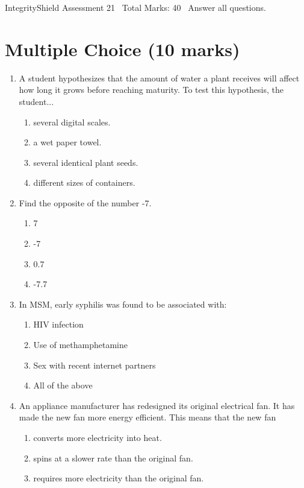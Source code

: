 \documentclass[12pt]{article}
\begin{document}
\begin{center}
IntegrityShield Assessment 21 \
Total Marks: 40 \
Answer all questions.
\end{center}

\section*{Multiple Choice (10 marks)}
\begin{enumerate}[label=\arabic*.]
\item A student hypothesizes that the amount of water a plant receives will affect how long it grows before reaching maturity. To test this hypothesis, the student...
\begin{enumerate}[label=(\alph*)]
    \item several digital scales.
    \item a wet paper towel.
    \item several identical plant seeds.
    \item different sizes of containers.
\end{enumerate}
\item Find the opposite of the number -7.
\begin{enumerate}[label=(\alph*)]
    \item 7
    \item -7
    \item 0.7
    \item -7.7
\end{enumerate}
\item In MSM, early syphilis was found to be associated with:
\begin{enumerate}[label=(\alph*)]
    \item HIV infection
    \item Use of methamphetamine
    \item Sex with recent internet partners
    \item All of the above
\end{enumerate}
\item An appliance manufacturer has redesigned its original electrical fan. It has made the new fan more energy efficient. This means that the new fan
\begin{enumerate}[label=(\alph*)]
    \item converts more electricity into heat.
    \item spins at a slower rate than the original fan.
    \item requires more electricity than the original fan.

\end{enumerate}
\end{enumerate}
\end{document}
